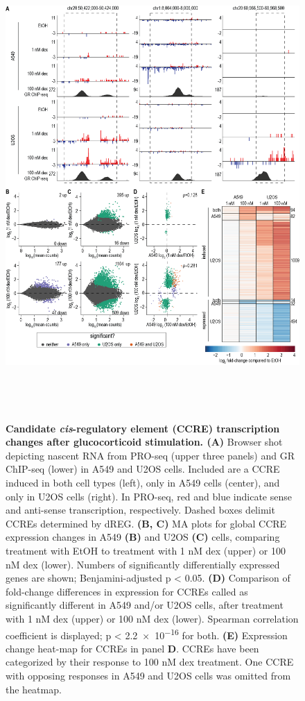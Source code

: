 \documentclass{article}
\begin{document}
{\begin{figure}[ht!]
\includegraphics[height=7in]{figures/Figure3_v2.png}
\caption{\textbf{Candidate \emph{cis}-regulatory element (CCRE) transcription changes after glucocorticoid stimulation. (A)} Browser shot depicting nascent RNA from PRO-seq (upper three panels) and GR ChIP-seq (lower) in A549 and U2OS cells. Included are a CCRE induced in both cell types (left), only in A549 cells (center), and only in U2OS cells (right). In PRO-seq, red and blue indicate sense and anti-sense transcription, respectively. Dashed boxes delimit CCREs determined by dREG. \textbf{(B, C)} MA plots for global CCRE expression changes in A549 \textbf{(B)} and U2OS \textbf{(C)} cells, comparing treatment with EtOH to treatment with 1 nM dex (upper) or 100 nM dex (lower). Numbers of significantly differentially expressed genes are shown; Benjamini-adjusted p < 0.05. \textbf{(D)} Comparison of fold-change differences in expression for CCREs called as significantly different in A549 and/or U2OS cells, after treatment with 1 nM dex (upper) or 100 nM dex (lower). Spearman correlation coefficient is displayed; p < \num{2.2e-16} for both. \textbf{(E)} Expression change heat-map for CCREs in panel \textbf{D}. CCREs have been categorized by their response to 100 nM dex treatment. One CCRE with opposing responses in A549 and U2OS cells was omitted from the heatmap.}
\label{fig:fig3}
\end{figure}

}
\end{document}
